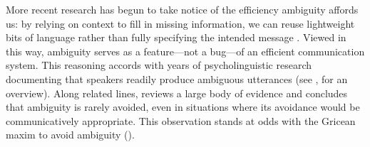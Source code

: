 \documentclass[10pt,a4paper]{article}
\newcommand{\gcs}[1]{\textcolor{blue}{[gcs: #1]}}
\begin{document}
%
%

More recent research has begun to take notice of the efficiency ambiguity affords us: by relying on context to fill in missing information, we can reuse lightweight bits of language rather than fully specifying the intended message \cite{levinson2000,piantadosietal2012,wasow2015}. 
Viewed in this way, ambiguity serves as a feature---not a bug---of an efficient communication system.
This reasoning accords with years of psycholinguistic research documenting that speakers readily produce ambiguous utterances (see , for an overview). 
Along related lines,  reviews a large body of evidence and concludes that ambiguity is rarely avoided, even in situations where its avoidance would be communicatively appropriate.
This observation stands at odds with the Gricean maxim to avoid ambiguity ().
\end{document}
